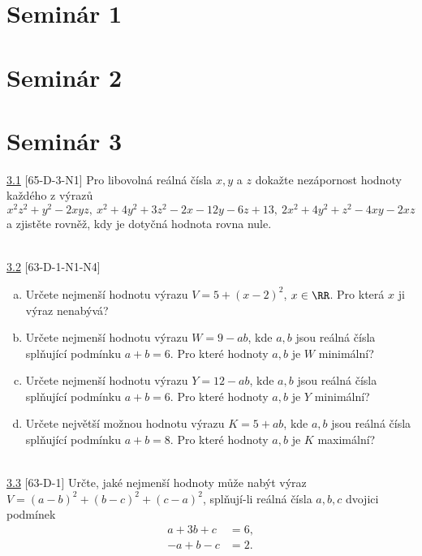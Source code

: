 \section*{Seminár 1}

\section*{Seminár 2}

\section*{Seminár 3}

\noindent \ul{3.1} [65-D-3-N1] Pro libovolná reálná čísla $x, y$ a $z$ dokažte
nezápornost hodnoty každého z výrazů $$x^2z^2+ y^2- 2xyz, \ x^2+ 4y^2+ 3z^2- 2x
- 12y - 6z + 13, \ 2x^2+ 4y^2 + z^2- 4xy - 2xz$$ a zjistěte rovněž, kdy je
dotyčná hodnota rovna nule.

\\

\noindent \ul{3.2} [63-D-1-N1-N4]
\begin{enumerate}[a)]
\item Určete nejmenší hodnotu výrazu $V = 5 + (x - 2)^2$, $x \in \RR$. Pro která $x$ ji výraz nenabývá?

\item Určete nejmenší hodnotu výrazu $W = 9 - ab$, kde $a, b$ jsou reálná čísla splňující podmínku $a + b = 6$. Pro které hodnoty $a, b$ je $W$ minimální?

\item Určete nejmenší hodnotu výrazu $Y = 12-ab$, kde $a, b$ jsou reálná čísla splňující podmínku $a + b = 6$. Pro které hodnoty $a, b$ je $Y$ minimální?

\item Určete největší možnou hodnotu výrazu $K = 5 + ab$, kde $a, b$ jsou reálná čísla splňující podmínku $a + b = 8$. Pro které hodnoty $a, b$ je $K$ maximální?
\end{enumerate}

\\

\noindent \ul{3.3} [63-D-1] Určte, jaké nejmenší hodnoty může nabýt výraz $V
= (a-b)^2 +(b-c)^2 +(c-a)^2$, splňují-li reálná čísla $a, b, c$ dvojici podmínek
\begin{align*}
a + 3b + c &= 6,\\
-a + b - c &= 2.
\end{align*}


\\

